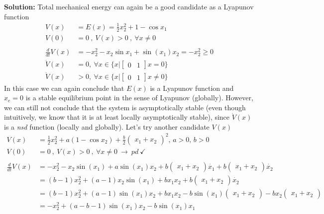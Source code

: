 \documentclass[twoside]{article}
\begin{document}
\textbf{Solution:} Total mechanical energy can again be a good candidate as
a Lyapunov function 
%
\begin{align*}
V(x) &= E(x) = \frac{1}{2} x_2^2 + 1 - \cos{x_1}  \\ 
V(0) &= 0 \ , \ V(x) > 0 \ , \ \forall x \neq 0
\\
\\
\frac{d}{dt} V(x) &= - x_2^2 - x_2 \sin x_1 + \sin(x_1) x_2 = - x_2^2 \geq 0
\\
\dot{V}(x) &= 0 ,\ \forall x \in \lbrace x | \begin{bmatrix}0 & 1\end{bmatrix} x = 0 \rbrace
\\
\dot{V}(x) &> 0 ,\ \forall x \in \lbrace x | \begin{bmatrix}0 & 1\end{bmatrix} x \neq 0 \rbrace
\end{align*}
%
In this case we can again conclude that $E(x)$ is a Lyapunov function and $x_e = 0$
is a stable equilibrium point in the sense of Lyapunov (globally). However, we can still not 
conclude that the system is asymptotically stable (even though intuitively, we know that it is 
at least locally asymptotically stable), since $\dot{V}(x)$ is a \textit{nsd} function 
(locally and globally). Let's try another candidate $V(x)$
%
\begin{align*}
V(x) &= \frac{1}{2} x_2^2 + a ( 1 - \cos{x_2} ) + \frac{b}{2} \begin{pmatrix} x_1 + x_2 \end{pmatrix}^2  ,
\, a > 0 , \,  b > 0
\\ 
V(0) &= 0 \ , \ V(x) > 0 \ , \ \forall x \neq 0 \ \rightarrow \ pd \ \checkmark
\\
\\
\frac{d}{dt} V(x) &= - x_2^2 - x_2 \sin(x_1) + a \sin(x_1) x_2 + b \begin{pmatrix} x_1 + x_2 \end{pmatrix} \dot{x_1} 
+ b \begin{pmatrix} x_1 + x_2 \end{pmatrix} \dot{x_2}
\\
&= (b - 1) x_2^2 + (a - 1) x_2 \sin(x_1) + b x_1 x_2 
+ b \begin{pmatrix} x_1 + x_2 \end{pmatrix} \dot{x_2}
\\
&= (b - 1) x_2^2 + (a - 1) \sin(x_1) x_2 + b x_1 x_2 
- b \sin(x_1) \begin{pmatrix} x_1 + x_2 \end{pmatrix} 
- b x_2\begin{pmatrix} x_1 + x_2 \end{pmatrix} 
\\
&= - x_2^2 + (a - b - 1) \sin(x_1) x_2 - b \sin(x_1) x_1 
\end{align*}
\end{document}
